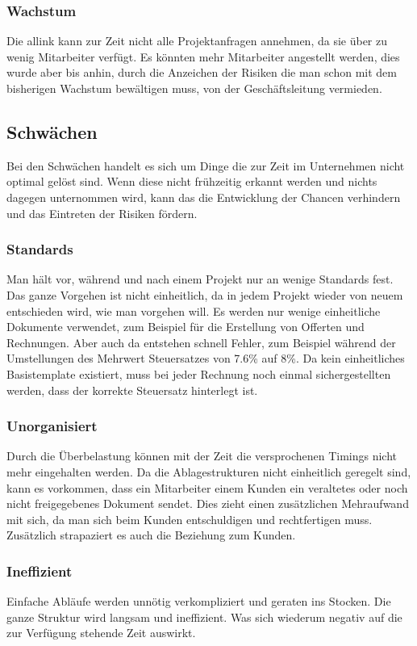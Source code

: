 \subsubsection{Wachstum}
Die allink kann zur Zeit nicht alle Projektanfragen annehmen, da sie über zu
wenig Mitarbeiter verfügt. Es könnten mehr Mitarbeiter angestellt werden, dies
wurde aber bis anhin, durch die Anzeichen der Risiken die man schon mit dem bisherigen
Wachstum bewältigen muss, von der Geschäftsleitung vermieden.

\subsection{Schwächen}
Bei den Schwächen handelt es sich um Dinge die zur Zeit im Unternehmen nicht
optimal gelöst sind. Wenn diese nicht frühzeitig erkannt werden und nichts
dagegen unternommen wird, kann das die Entwicklung der Chancen verhindern und
das Eintreten der Risiken fördern.

\subsubsection{Standards}
Man hält vor, während und nach einem Projekt nur an wenige Standards fest. 
Das ganze Vorgehen ist nicht einheitlich, da in jedem Projekt wieder von
neuem entschieden wird, wie man vorgehen will. Es werden nur wenige einheitliche
Dokumente verwendet, zum Beispiel für die Erstellung von Offerten und Rechnungen.
Aber auch da entstehen schnell Fehler, zum Beispiel während der Umstellungen des 
Mehrwert Steuersatzes von 7.6\% auf 8\%. Da kein einheitliches Basistemplate
existiert, muss bei jeder Rechnung noch einmal sichergestellten werden, dass
der korrekte Steuersatz hinterlegt ist.

\subsubsection{Unorganisiert}
Durch die Überbelastung können mit der Zeit die versprochenen Timings
nicht mehr eingehalten werden. Da die Ablagestrukturen nicht einheitlich geregelt
sind, kann es vorkommen, dass ein Mitarbeiter einem Kunden ein veraltetes oder
noch nicht freigegebenes Dokument sendet. Dies zieht einen zusätzlichen 
Mehraufwand mit sich, da man sich beim Kunden entschuldigen und rechtfertigen
muss. Zusätzlich strapaziert es auch die Beziehung zum Kunden.

\subsubsection{Ineffizient}
Einfache Abläufe werden unnötig verkompliziert und geraten ins Stocken. Die ganze
Struktur wird langsam und ineffizient. Was sich wiederum negativ auf die zur
Verfügung stehende Zeit auswirkt.

